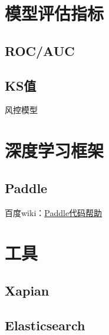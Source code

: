 \documentclass[UTF8,11pt,a4paper]{ctexart}
\begin{document}
\section{模型评估指标}
\subsection{ROC/AUC}
\subsection{KS值}
风控模型

\section{深度学习框架}
\subsection{Paddle}

百度wiki：\href{http://wiki.baidu.com/pages/viewpage.action?pageId=38550738}{Paddle代码帮助}


\section{工具}
\subsection{Xapian}
\subsection{Elasticsearch}
\end{document}
